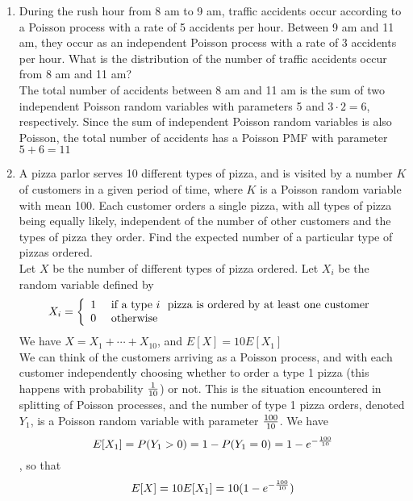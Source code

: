 \documentclass[12pt]{article}%
\newcommand{\0}{{\bf 0}}
\begin{document}
\begin{enumerate}
\begin{enumerate}
\end{enumerate}




\item
During the rush hour from 8 am to 9 am,
traffic accidents occur according to a Poisson process with a rate of 5 accidents per hour. Between 9 am and 11 am, they occur as an independent Poisson process with a rate of 3 accidents per hour. 
What is the distribution of the number of traffic accidents occur from 8 am and 11 am?
\\
{\color{blue}{\bf Sol.}}
The total number of accidents between 8 am and 11
am is the sum of two independent Poisson random variables with parameters 5 and
$3 \cdot 2 = 6$, respectively. Since the sum of independent Poisson random variables is also
Poisson, the total number of accidents has a Poisson PMF with parameter $5+6=11$




\item
A pizza parlor serves 10 different types of pizza, and is visited by a number $K$ of customers in a given period of time, where $K$ is a Poisson random variable with mean 100. Each customer orders a single pizza, with all types of pizza being equally likely, independent of the number of other customers and the types of pizza they order. Find the expected number of a particular type of pizzas ordered.
\\
{\color{blue}{\bf Sol.}}
Let $X$ be the number of different types of pizza ordered. Let $X_i$ be the random variable defined by
$$
X_i=\left\{\ba{ll}
1 &\ \mb{if a type}~ i~ \mb{ pizza is ordered by at least one customer} \\
0 &\ \mb{otherwise}\
\ea\right.
$$
We have $X = X_1 + \cdots + X_{10}$, and $E[X] = 10E[X_1]$
\\
We can think of the customers arriving as a Poisson process, and with each
customer independently choosing whether to order a type 1 pizza (this happens with
probability $\f{1}{10}$) or not. This is the situation encountered in splitting of Poisson processes,
and the number of type 1 pizza orders, denoted $Y_1$, is a Poisson random variable
with parameter $\f{100}{10}$. We have
$$E[X_1] = P(Y_1 > 0) = 1 - P(Y_1 = 0) = 1 - e^{-\f{100}{10}}$$,
so that
$$E[X] = 10E[X_1] = 10(1 - e^{-\f{100}{10}})$$






\end{enumerate}
\end{document}
